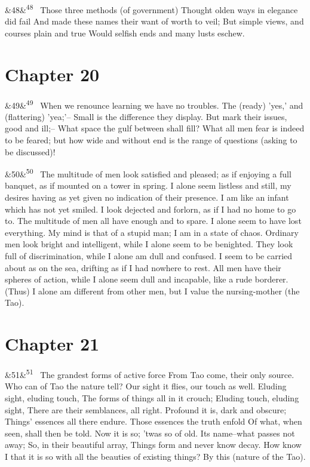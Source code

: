 \documentclass[12pt]{article}
\newcommand{\para}[1][]{\par\noindent\ifx&#1&\else\textsuperscript{\footnotesize #1}~\fi}
\begin{document}
\para[48] Those three methods (of government) Thought olden ways in elegance did fail And made these names their want of worth to veil; But simple views, and courses plain and true Would selfish ends and many lusts eschew.

\section*{Chapter 20}

\para[49] When we renounce learning we have no troubles. The (ready) 'yes,' and (flattering) 'yea;'-- Small is the difference they display. But mark their issues, good and ill;-- What space the gulf between shall fill? What all men fear is indeed to be feared; but how wide and without end is the range of questions (asking to be discussed)!

\para[50] The multitude of men look satisfied and pleased; as if enjoying a full banquet, as if mounted on a tower in spring. I alone seem listless and still, my desires having as yet given no indication of their presence. I am like an infant which has not yet smiled. I look dejected and forlorn, as if I had no home to go to. The multitude of men all have enough and to spare. I alone seem to have lost everything. My mind is that of a stupid man; I am in a state of chaos. Ordinary men look bright and intelligent, while I alone seem to be benighted. They look full of discrimination, while I alone am dull and confused. I seem to be carried about as on the sea, drifting as if I had nowhere to rest. All men have their spheres of action, while I alone seem dull and incapable, like a rude borderer. (Thus) I alone am different from other men, but I value the nursing-mother (the Tao).

\section*{Chapter 21}

\para[51] The grandest forms of active force From Tao come, their only source. Who can of Tao the nature tell? Our sight it flies, our touch as well. Eluding sight, eluding touch, The forms of things all in it crouch; Eluding touch, eluding sight, There are their semblances, all right. Profound it is, dark and obscure; Things' essences all there endure. Those essences the truth enfold Of what, when seen, shall then be told. Now it is so; 'twas so of old. Its name--what passes not away; So, in their beautiful array, Things form and never know decay. How know I that it is so with all the beauties of existing things? By this (nature of the Tao).
\end{document}
